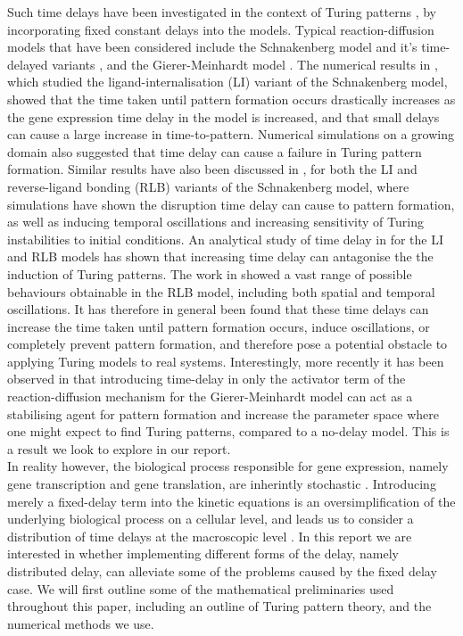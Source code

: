 \documentclass[12pt]{report}
\begin{document}
Such time delays have been investigated in the context of Turing patterns \cite{gaffmonk,leegaffney,yigaffneyli,jiang,leegaffmonk,bratsun,william}, by incorporating fixed constant delays into the models. Typical reaction-diffusion models that have been considered include the Schnakenberg model and it's time-delayed variants \cite{schnakenberg}, and the Gierer-Meinhardt model \cite{gm}. The numerical results in \cite{gaffmonk}, which studied the ligand-internalisation (LI) variant of the Schnakenberg model, showed that the time taken until pattern formation occurs drastically increases as the gene expression time delay in the model is increased, and that small delays can cause a large increase in time-to-pattern. Numerical simulations on a growing domain also suggested that time delay can cause a failure in Turing pattern formation. Similar results have also been discussed in \cite{leegaffney,leegaffmonk}, for both the LI and reverse-ligand bonding (RLB) variants of the Schnakenberg model, where simulations have shown the disruption time delay can cause to pattern formation, as well as inducing temporal oscillations and increasing sensitivity of Turing instabilities to initial conditions. An analytical study of time delay in \cite{yigaffneyli} for the LI and RLB models has shown that increasing time delay can antagonise the the induction of Turing patterns. The work in \cite{jiang} showed a vast range of possible behaviours obtainable in the RLB model, including both spatial and temporal oscillations. It has therefore in general been found that these time delays can increase the time taken until pattern formation occurs, induce oscillations, or completely prevent pattern formation, and therefore pose a potential obstacle to applying Turing models to real systems. Interestingly, more recently it has been observed in \cite{fadai} that introducing time-delay in only the activator term of the reaction-diffusion mechanism for the Gierer-Meinhardt model can act as a stabilising agent for pattern formation and increase the parameter space where one might expect to find Turing patterns, compared to a no-delay model. This is a result we look to explore in our report.
\\
In reality however, the biological process responsible for gene expression, namely gene transcription and gene translation, are inherintly stochastic \cite{raj,elowitz,mcadams,paulsson}. Introducing merely a fixed-delay term into the kinetic equations is an oversimplification of the underlying biological process on a cellular level, and leads us to consider a distribution of time delays at the macroscopic level \cite{bratsun,krausenew}. In this report we are interested in whether implementing different forms of the delay, namely distributed delay, can alleviate some of the problems caused by the fixed delay case. We will first outline some of the mathematical preliminaries used throughout this paper, including an outline of Turing pattern theory, and the numerical methods we use.
\end{document}
